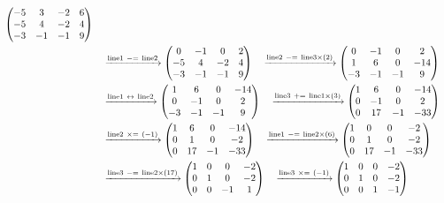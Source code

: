 \documentclass{ltjsarticle}
\begin{document}
\begin{align*}
 \begin{pmatrix}
 - 5 & 3 & - 2 & 6\\
 - 5 & 4 & - 2 & 4\\
 - 3 & -1 & -1 & 9
\end{pmatrix}\allowdisplaybreaks\\
&\ \ \ \xrightarrow{ \text{line} 1 \ -=\  \text{line} 2 } %
\begin{pmatrix}
 0 & -1 & 0 & 2\\
 - 5 & 4 & - 2 & 4\\
 - 3 & -1 & -1 & 9
\end{pmatrix}\ \ \ \xrightarrow{ \text{line} 2 \ -=\  \text{line} 3 \times\left( 2 \right)} %
\begin{pmatrix}
 0 & -1 & 0 & 2\\
 1 & 6 & 0 & - 14\\
 - 3 & -1 & -1 & 9
\end{pmatrix}\allowdisplaybreaks\\
 &\ \ \ \xrightarrow{ \text{line} 1 \ \leftrightarrow\  \text{line} 2 } %
\begin{pmatrix}
 1 & 6 & 0 & - 14\\
 0 & -1 & 0 & 2\\
 - 3 & -1 & -1 & 9
\end{pmatrix}\ \ \ \xrightarrow{ \text{line} 3 \ +=\  \text{line} 1 \times\left( 3 \right)} %
\begin{pmatrix}
 1 & 6 & 0 & - 14\\
 0 & -1 & 0 & 2\\
 0 & 17 & -1 & - 33
\end{pmatrix}\allowdisplaybreaks\\
 &\ \ \ \xrightarrow{ \text{line} 2 \ \times=\ \left( - 1 \right)} %
\begin{pmatrix}
 1 & 6 & 0 & - 14\\
 0 & 1 & 0 & - 2\\
 0 & 17 & -1 & - 33
\end{pmatrix}\ \ \ \xrightarrow{ \text{line} 1 \ -=\  \text{line} 2 \times\left( 6 \right)} %
\begin{pmatrix}
 1 & 0 & 0 & - 2\\
 0 & 1 & 0 & - 2\\
 0 & 17 & -1 & - 33
\end{pmatrix}\allowdisplaybreaks\\
 &\ \ \ \xrightarrow{ \text{line} 3 \ -=\  \text{line} 2 \times\left( 17 \right)} %
\begin{pmatrix}
 1 & 0 & 0 & - 2\\
 0 & 1 & 0 & - 2\\
 0 & 0 & -1 & 1
\end{pmatrix}\ \ \ \xrightarrow{ \text{line} 3 \ \times=\ \left( - 1 \right)} %
\begin{pmatrix}
 1 & 0 & 0 & - 2\\
 0 & 1 & 0 & - 2\\
 0 & 0 & 1 & -1
\end{pmatrix}
\end{align*}
\end{document}
